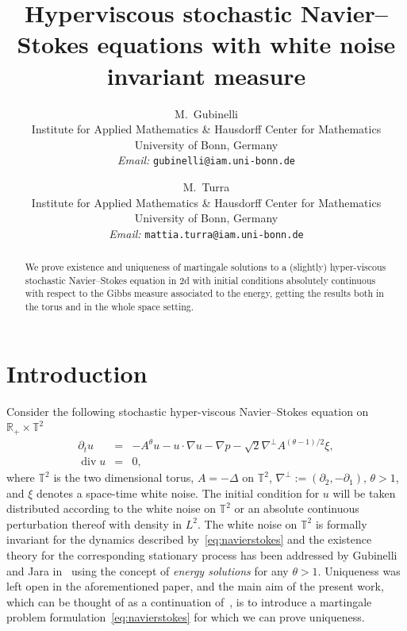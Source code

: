 \documentclass[10pt]{article}
\newcommand{\assign}{:=}
\newcommand{\nosymbol}{}
\newcommand{\tmaffiliation}[1]{\\ #1}
\newcommand{\tmemail}[1]{\\ \textit{Email:} \texttt{#1}}
\newcommand{\tmop}[1]{\ensuremath{\operatorname{#1}}}
\newcommand{\tmtextit}[1]{{\itshape{#1}}}
\begin{document}
\title{Hyperviscous stochastic Navier--Stokes equations with white noise
invariant measure}

\author{
  M.~Gubinelli
  \tmaffiliation{Institute for Applied Mathematics \& Hausdorff Center for
  Mathematics\\
  University of Bonn, Germany}
  \tmemail{gubinelli@iam.uni-bonn.de}
  \and
  M.~Turra
  \tmaffiliation{Institute for Applied Mathematics \& Hausdorff Center for
  Mathematics\\
  University of Bonn, Germany}
  \tmemail{mattia.turra@iam.uni-bonn.de}
}

\maketitle

\begin{abstract}
  We prove existence and uniqueness of martingale solutions to a (slightly)
  hyper-viscous stochastic Navier--Stokes equation in 2d with initial
  conditions absolutely continuous with respect to the Gibbs measure
  associated to the energy, getting the results both in the torus and in the
  whole space setting.
\end{abstract}

\section{Introduction}

Consider the following stochastic hyper-viscous Navier--Stokes equation on
$\mathbb{R}_+ \times \mathbb{T}^2$
\begin{equation}
  \begin{array}{lll}
    \partial_t u & = & - A^{\theta} u - u \nosymbol \cdot \nabla u - \nabla p
    - \sqrt{2} \nabla^{\perp} A^{(\theta - 1) / 2} \xi,\\
    \tmop{div} u & = & 0,
  \end{array} \label{eq:navierstokes}
\end{equation}
where $\mathbb{T}^2$ is the two dimensional torus, $A = - \Delta$ on
$\mathbb{T}^2$, $\nabla^{\perp} \assign (\partial_2, - \partial_1)$, $\theta >
1$, and $\xi$ denotes a space-time white noise. The initial condition for $u$
will be taken distributed according to the white noise on $\mathbb{T}^2$ or an
absolute continuous perturbation thereof with density in $L^2$. The white
noise on $\mathbb{T}^2$ is formally invariant for the dynamics described
by~{\eqref{eq:navierstokes}} and the existence theory for the corresponding
stationary process has been addressed by Gubinelli and Jara
in~{\cite{gubinelli2013regularization}} using the concept of \tmtextit{energy
solutions} for any $\theta > 1$. Uniqueness was left open in the
aforementioned paper, and the main aim of the present work, which can be
thought of as a continuation of~{\cite{gubinelli2018infinitesimal}}, is to
introduce a martingale problem formulation~{\eqref{eq:navierstokes}} for which
we can prove uniqueness.
\end{document}
